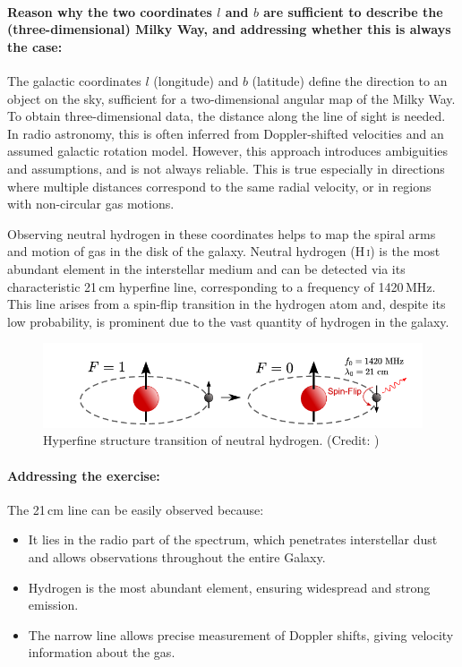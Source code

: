 \documentclass[12pt,a4paper]{article}
\begin{document}
\paragraph{Reason why the two coordinates \( l \) and \( b \) are sufficient to describe the (three-dimensional) Milky Way, and addressing whether this is always the case:} 
The galactic coordinates \( l \) (longitude) and \( b \) (latitude) define the direction to an object on the sky, sufficient for a two-dimensional angular map of the Milky Way. To obtain three-dimensional data, the distance along the line of sight is needed. In radio astronomy, this is often inferred from Doppler-shifted velocities and an assumed galactic rotation model. However, this approach introduces ambiguities and assumptions, and is not always reliable. This is true especially in directions where multiple distances correspond to the same radial velocity, or in regions with non-circular gas motions.

Observing neutral hydrogen in these coordinates helps to map the spiral arms and motion of gas in the disk of the galaxy. Neutral hydrogen (H\,\textsc{i}) is the most abundant element in the interstellar medium and can be detected via its characteristic 21\,cm hyperfine line, corresponding to a frequency of 1420\,MHz. This line arises from a spin-flip transition in the hydrogen atom and, despite its low probability, is prominent due to the vast quantity of hydrogen in the galaxy.
\begin{figure}[H]
  \centering
  \includegraphics[width=1.0\textwidth]{Pictures/hydrogen.png}
  \caption{Hyperfine structure transition of neutral hydrogen. (Credit: \cite{enwiki:1280656493})}
  \label{fig:spin}
\end{figure}
\paragraph{\textbf{Addressing the exercise:}}
The 21\,cm line can be easily observed because:
\begin{itemize}
    \item It lies in the radio part of the spectrum, which penetrates interstellar dust and allows observations throughout the entire Galaxy.
    \item Hydrogen is the most abundant element, ensuring widespread and strong emission.
    \item The narrow line allows precise measurement of Doppler shifts, giving velocity information about the gas.
\end{itemize}
\end{document}
